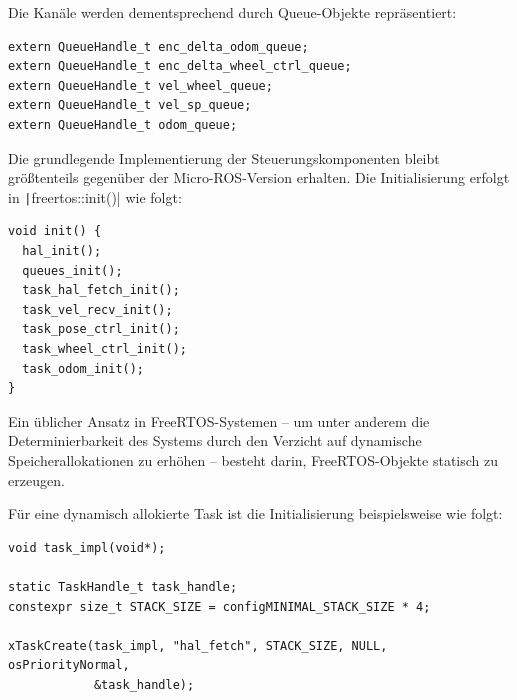 Die Kanäle werden dementsprechend durch Queue-Objekte repräsentiert:

\begin{code}
\begin{verbatim}
extern QueueHandle_t enc_delta_odom_queue;
extern QueueHandle_t enc_delta_wheel_ctrl_queue;
extern QueueHandle_t vel_wheel_queue;
extern QueueHandle_t vel_sp_queue;
extern QueueHandle_t odom_queue;
\end{verbatim}
\end{code}

Die grundlegende Implementierung der Steuerungskomponenten bleibt größtenteils
gegenüber der Micro-ROS-Version erhalten. Die Initialisierung erfolgt in
\texttt|freertos::init()| wie folgt:

\begin{code}
\begin{verbatim}
void init() {
  hal_init();
  queues_init();
  task_hal_fetch_init();
  task_vel_recv_init();
  task_pose_ctrl_init();
  task_wheel_ctrl_init();
  task_odom_init();
}
\end{verbatim}
\end{code}

Ein üblicher Ansatz in FreeRTOS-Systemen -- um unter anderem die
Determinierbarkeit des Systems durch den Verzicht auf dynamische
Speicherallokationen zu erhöhen \cite{freertos_memory_management} -- besteht
darin, FreeRTOS-Objekte statisch zu erzeugen.


Für eine dynamisch allokierte Task ist die Initialisierung beispielsweise wie
folgt:

\begin{code}
\begin{verbatim}
void task_impl(void*);

static TaskHandle_t task_handle;
constexpr size_t STACK_SIZE = configMINIMAL_STACK_SIZE * 4;

xTaskCreate(task_impl, "hal_fetch", STACK_SIZE, NULL, osPriorityNormal,
            &task_handle);
\end{verbatim}
\end{code}

